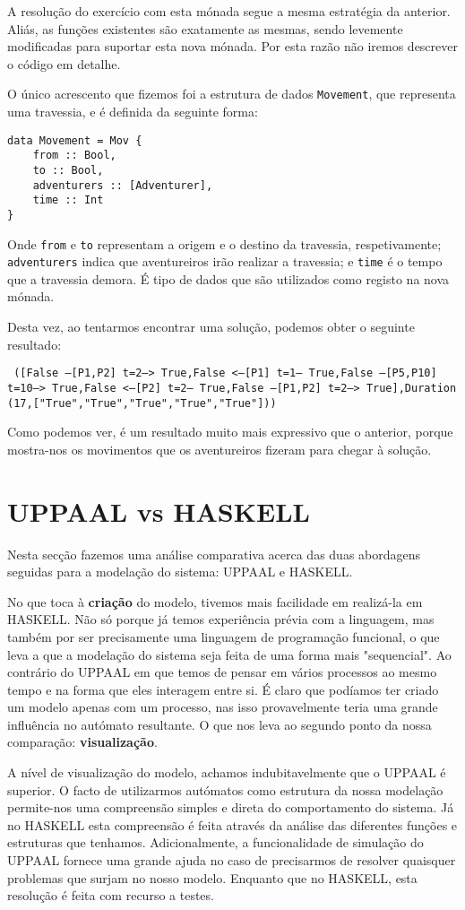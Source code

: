 \documentclass[12pt]{extarticle}
\begin{document}
A resolução do exercício com esta mónada segue a mesma estratégia da anterior.
Aliás, as funções existentes são exatamente as mesmas, sendo levemente modificadas para suportar esta nova mónada.
Por esta razão não iremos descrever o código em detalhe.

O único acrescento que fizemos foi a estrutura de dados \texttt{Movement}, que representa uma travessia, e é definida da seguinte forma:
\begin{lstlisting}
data Movement = Mov {
    from :: Bool,
    to :: Bool,
    adventurers :: [Adventurer],
    time :: Int
}
\end{lstlisting}
Onde \texttt{from} e \texttt{to} representam a origem e o destino da travessia, respetivamente;
\texttt{adventurers} indica que aventureiros irão realizar a travessia; e \texttt{time} é o tempo que a travessia demora.
É tipo de dados que são utilizados como registo na nova mónada.

Desta vez, ao tentarmos encontrar uma solução, podemos obter o seguinte resultado:

\texttt{
([False ---[P1,P2] t=2--> True,False <--[P1] t=1--- True,False ---[P5,P10] t=10--> True,False <--[P2] t=2--- True,False ---[P1,P2] t=2--> True],Duration (17,["True","True","True","True","True"]))
}

Como podemos ver, é um resultado muito mais expressivo que o anterior, porque mostra-nos os movimentos que os aventureiros fizeram para chegar à solução.

\section{UPPAAL vs HASKELL}
Nesta secção fazemos uma análise comparativa acerca das duas abordagens seguidas para a modelação do sistema: UPPAAL e HASKELL.

No que toca à \textbf{criação} do modelo, tivemos mais facilidade em realizá-la em HASKELL.
Não só porque já temos experiência prévia com a linguagem, mas também por ser precisamente uma linguagem de programação funcional, o que leva a que a modelação do sistema seja feita de uma forma mais "sequencial".
Ao contrário do UPPAAL em que temos de pensar em vários processos ao mesmo tempo e na forma que eles interagem entre si.
É claro que podíamos ter criado um modelo apenas com um processo, nas isso provavelmente teria uma grande influência no autómato resultante.
O que nos leva ao segundo ponto da nossa comparação: \textbf{visualização}.

A nível de visualização do modelo, achamos indubitavelmente que o UPPAAL é superior.
O facto de utilizarmos autómatos como estrutura da nossa modelação permite-nos uma compreensão simples e direta do comportamento do sistema.
Já no HASKELL esta compreensão é feita através da análise das diferentes funções e estruturas que tenhamos.
Adicionalmente, a funcionalidade de simulação do UPPAAL fornece uma grande ajuda no caso de precisarmos de resolver quaisquer problemas que surjam no nosso modelo.
Enquanto que no HASKELL, esta resolução é feita com recurso a testes.
\end{document}
